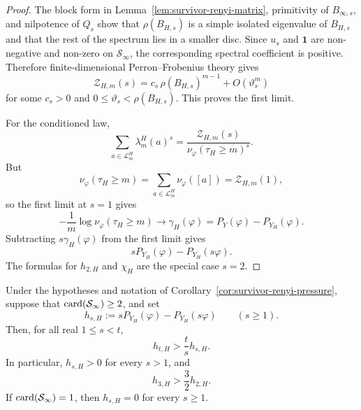 \begin{proof}
The block form in Lemma~\ref{lem:survivor-renyi-matrix}, primitivity of
\(B_{\infty,s}\), and nilpotence of \(Q_s\) show that
\(\rho(B_{H,s})\) is a simple isolated eigenvalue of
\(B_{H,s}\) and that the rest of the spectrum lies in a smaller disc.
Since \(u_s\) and \(\mathbf 1\) are non-negative and non-zero on
\(\mathcal S_\infty\), the corresponding spectral coefficient is
positive.  Therefore finite-dimensional Perron--Frobenius theory gives
\[
  \mathcal Z_{H,m}(s)
  = c_s\,\rho(B_{H,s})^{m-1}+O(\vartheta_s^m)
\]
for some \(c_s>0\) and \(0\leq \vartheta_s<\rho(B_{H,s})\).  This proves
the first limit.

For the conditioned law,
\[
  \sum_{a\in\mathcal L_m^H}\lambda_m^H(a)^s
  = \frac{\mathcal Z_{H,m}(s)}
         {\nu_\varphi(\tau_H\ge m)^s}.
\]
But
\[
  \nu_\varphi(\tau_H\geq m)
  = \sum_{a\in\mathcal L_m^H}\nu_\varphi([a])
  = \mathcal Z_{H,m}(1),
\]
so the first limit at \(s=1\) gives
\[
  -\frac1m\log \nu_\varphi(\tau_H\ge m)\longrightarrow \gamma_H(\varphi)
  = P_Y(\varphi)-P_{Y_H}(\varphi).
\]
Subtracting \(s\gamma_H(\varphi)\) from the first limit gives
\[
  sP_{Y_H}(\varphi)-P_{Y_H}(s\varphi).
\]
The formulas for \(h_{2,H}\) and \(\chi_H\) are the special case
\(s=2\).
\end{proof}

\begin{proposition}
\label{prop:strict-survivor-renyi}
Under the hypotheses and notation of
Corollary~\ref{cor:survivor-renyi-pressure}, suppose that
\(\operatorname{card}(\mathcal S_\infty)\geq2\), and set
\[
  h_{s,H}:=sP_{Y_H}(\varphi)-P_{Y_H}(s\varphi)
  \qquad(s\geq1).
\]
Then, for all real \(1\leq s<t\),
\[
  h_{t,H}>\frac{t}{s}h_{s,H}.
\]
In particular, \(h_{s,H}>0\) for every \(s>1\), and
\[
  h_{3,H}>\frac32h_{2,H}.
\]
If \(\operatorname{card}(\mathcal S_\infty)=1\), then \(h_{s,H}=0\) for every
\(s\geq1\).
\end{proposition}

